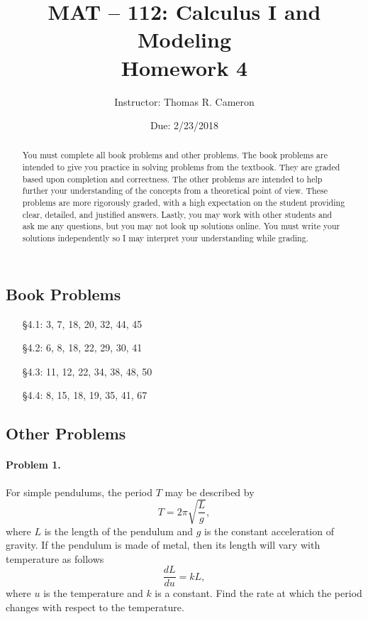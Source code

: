 \documentclass{article}
\title{MAT -- 112: Calculus I and Modeling\\
\large{Homework 4}}
\author{Instructor: Thomas R. Cameron}
\date{Due: 2/23/2018}
\begin{document}
\maketitle

\begin{abstract}
You must complete all book problems and other problems. The book problems are intended to give you practice in solving problems from the textbook. They are graded based upon completion and correctness. The other problems are intended to help further your understanding of the concepts from a theoretical point of view. These problems are more rigorously graded, with a high expectation on the student providing clear, detailed, and justified answers. Lastly, you may work with other students and ask me any questions, but you may not look up solutions online. You must write your solutions independently so I may interpret your understanding while grading. 
\end{abstract}

\subsection*{Book Problems}
\begin{itemize}
\item   [\S 4.1:] 3, 7, 18, 20, 32, 44, 45
\item   [\S 4.2:] 6, 8, 18, 22, 29, 30, 41
\item   [\S 4.3:] 11, 12, 22, 34, 38, 48, 50
\item   [\S 4.4:]	8, 15, 18, 19, 35, 41, 67
\end{itemize}

\subsection*{Other Problems}

\paragraph*{Problem 1.} For simple pendulums, the period $T$ may be described by
\[
T=2\pi\sqrt{\frac{L}{g}},
\]
where $L$ is the length of the pendulum and $g$ is the constant acceleration of gravity. If the pendulum is made of metal, then its length will vary with temperature as follows
\[
\frac{dL}{du}=kL,
\]
where $u$ is the temperature and $k$ is a constant. Find the rate at which the period changes with respect to the temperature. 
\end{document}
